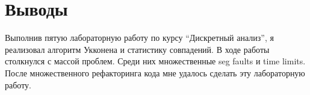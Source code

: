 \section{Выводы}
Выполнив пятую лабораторную работу по курсу \enquote{Дискретный анализ}, я реализовал алгоритм Укконена и статистику совпадений. В ходе работы
столкнулся с массой проблем. Среди них множественные seg faults и time limits. После множественного рефакторинга кода мне удалось
сделать эту лабораторную работу.
\pagebreak
